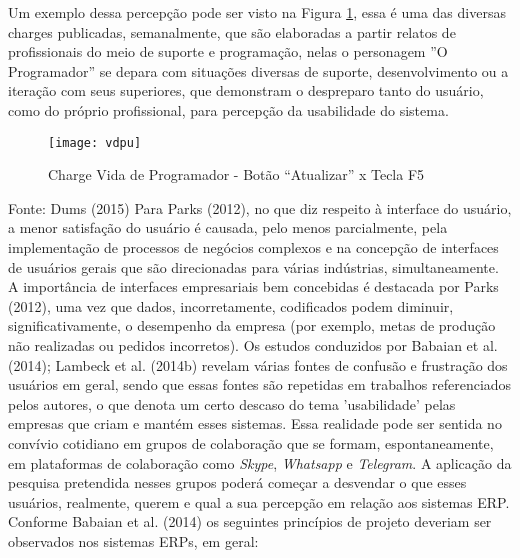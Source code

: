 \indent Um exemplo dessa percepção pode ser visto na Figura \ref{fig:vdpu}, essa é uma das diversas charges publicadas, semanalmente, que são elaboradas a partir relatos de profissionais do meio de suporte e programação, nelas o personagem ”O Programador” se depara com situações diversas de suporte, desenvolvimento ou a iteração com seus superiores, que demonstram o despreparo tanto do usuário, como do próprio profissional, para percepção da usabilidade do sistema.

\begin{figure}[H]
	\centering	
	\caption{Charge Vida de Programador - Botão “Atualizar” x Tecla F5}
	\texttt{[image: vdpu]}
	\label{fig:vdpu}
\end{figure}
\vspace{-0.8 cm} \hspace{1.85 cm} Fonte: Dums (2015)\newline
\indent Para Parks (2012), no que diz respeito à interface do usuário, a menor satisfação do usuário é causada, pelo menos parcialmente, pela implementação de processos de negócios complexos e na concepção de interfaces de usuários gerais que são direcionadas para várias indústrias, simultaneamente.\newline
\indent A importância de interfaces empresariais bem concebidas é destacada por Parks (2012), uma vez que dados, incorretamente, codificados podem diminuir, significativamente, o desempenho da empresa (por exemplo, metas de produção não realizadas ou pedidos incorretos).\newline
\indent Os estudos conduzidos por Babaian et al. (2014); Lambeck et al. (2014b) revelam várias fontes de confusão e frustração dos usuários em geral, sendo que essas fontes são repetidas em trabalhos referenciados pelos autores, o que denota um certo descaso do tema ’usabilidade’ pelas empresas que criam e mantém esses sistemas.\newline
\indent Essa realidade pode ser sentida no convívio cotidiano em grupos de colaboração que se formam, espontaneamente, em plataformas de colaboração como \textit{Skype}, \textit{Whatsapp} e \textit{Telegram}. A aplicação da pesquisa pretendida nesses grupos poderá começar a desvendar o que esses usuários, realmente, querem e qual a sua percepção em relação aos sistemas ERP.\newline
\indent Conforme Babaian et al. (2014) os seguintes princípios de projeto deveriam ser observados nos sistemas ERPs, em geral:

